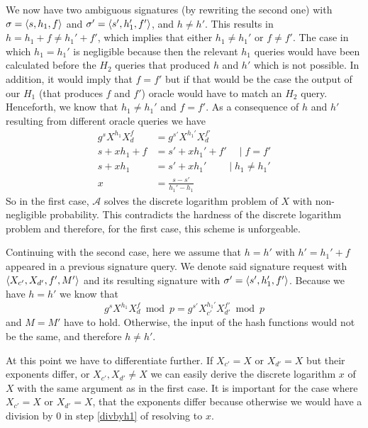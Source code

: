 We now have two ambiguous signatures (by rewriting the second one) with \(\sigma = \langle s, h_1, f \rangle\) and \(\sigma^\prime = \langle s', h_1', f' \rangle\), and \(h \neq h'\).
This results in \(h = h_1 + f \neq h_1' + f'\), which implies that either \(h_1 \neq h_1'\) or \(f \neq f'\).
The case in which \(h_1 = h_1'\) is negligible because then the relevant \(h_1\) queries would have been calculated before the \(H_2\) queries that produced \(h\) and \(h'\) which is not possible.
In addition, it would imply that \(f = f'\) but if that would be the case the output of our \(H_1\) (that produces \(f\) and \(f'\)) oracle would have to match an \(H_2\) query.
Henceforth, we know that \(h_1 \neq h_1'\) and \(f = f'\).
As a consequence of \(h\) and \(h'\) resulting from different oracle queries we have
\begin{align}
  g^{s} X^{h_1} X_d^f &= g^{s'} X^{h_1'} X_d^{f'} \\
  s + x h_1 + f &= s' + x h_1' + f' \quad\mid f=f'\\
  s + x h_1 &= s' + x h_1' \qquad \mid h_1 \neq h_1' \label{divbyh1}\\
  x &= \frac{s-s'}{h_1' - h_1}
\end{align}
So in the first case, \(\mathcal{A}\) solves the discrete logarithm problem of \(X\) with non-negligible probability.
This contradicts the hardness of the discrete logarithm problem and therefore, for the first case, this scheme is unforgeable.

Continuing with the second case, here we assume that \(h = h'\) with \(h' = h_1' + f\) appeared in a previous signature query.
We denote said signature request with \(\langle X_{c'}, X_{d'}, f', M' \rangle\) and its resulting signature with \(\sigma' = \langle s', h_1', f' \rangle\).
Because we have \(h = h'\) we know that
  \[g^s X^{h_1} X_d^f \bmod p  = g^{s'} X_{c'}^{h_1'} X_{d'}^{f'} \bmod p \]
and \(M = M'\) have to hold.
Otherwise, the input of the hash functions would not be the same, and therefore \(h \neq h'\).

At this point we have to differentiate further.
If \(X_{c'} = X\) or \(X_{d'} = X\) but their exponents differ, or \(X_{c'},X_{d'} \neq X\) we can easily derive the discrete logarithm \(x\) of \(X\) with the same argument as in the first case.
It is important for the case where \(X_{c'} = X\) or \(X_{d'} = X\), that the exponents differ because otherwise we would have a division by 0 in step \ref{divbyh1} of resolving to \(x\).

